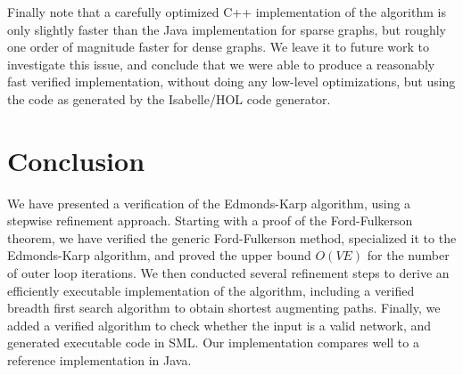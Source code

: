 \documentclass{llncs}
\begin{document}
  Finally note that a carefully optimized C++ implementation of the algorithm is only slightly faster than the Java implementation for sparse graphs,
  but roughly one order of magnitude faster for dense graphs. We leave it to future work to investigate this issue, and conclude that we were able to produce
  a reasonably fast verified implementation, without doing any low-level optimizations, but using the code as generated by the Isabelle/HOL code generator.
  
% 
% 
    
    

\section{Conclusion}\label{sec:concl}
  We have presented a verification of the Edmonds-Karp algorithm, using a stepwise refinement approach.
  Starting with a proof of the Ford-Fulkerson theorem, we have verified the generic Ford-Fulkerson method, 
  specialized it to the Edmonds-Karp algorithm, and proved the upper bound $O(VE)$ for the number of outer loop iterations.
  We then conducted several refinement steps to derive an efficiently executable implementation of the algorithm, 
  including a verified breadth first search algorithm to obtain shortest augmenting paths. 
  Finally, we added a verified algorithm to check whether the input is a valid network, and generated executable code in SML.
  Our implementation compares well to a reference implementation in Java.
  
\end{document}
